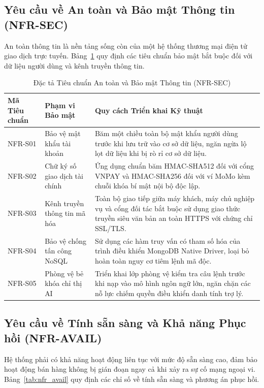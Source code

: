 \subsection{Yêu cầu về An toàn và Bảo mật Thông tin (NFR-SEC)}
An toàn thông tin là nền tảng sống còn của một hệ thống thương mại điện tử giao dịch trực tuyến. Bảng~\ref{tab:nfr_sec} quy định các tiêu chuẩn bảo mật bắt buộc đối với dữ liệu người dùng và kênh truyền thông tin.

\begin{table}[H]
\centering
\caption{Đặc tả Tiêu chuẩn An toàn và Bảo mật Thông tin (NFR-SEC)}
\label{tab:nfr_sec}
\begin{tabularx}{\textwidth}{p{2.5cm}p{4.5cm}X}
\toprule
\textbf{Mã Tiêu chuẩn} & \textbf{Phạm vi Bảo mật} & \textbf{Quy cách Triển khai Kỹ thuật} \\
\midrule
NFR-S01 & Bảo vệ mật khẩu tài khoản & Băm một chiều toàn bộ mật khẩu người dùng trước khi lưu trữ vào cơ sở dữ liệu, ngăn ngừa lộ lọt dữ liệu khi bị rò rỉ cơ sở dữ liệu. \\
\addlinespace
NFR-S02 & Chữ ký số giao dịch tài chính & Ứng dụng chuẩn băm HMAC-SHA512 đối với cổng VNPAY và HMAC-SHA256 đối với ví MoMo kèm chuỗi khóa bí mật nội bộ độc lập. \\
\addlinespace
NFR-S03 & Kênh truyền thông tin mã hóa & Toàn bộ giao tiếp giữa máy khách, máy chủ nghiệp vụ và cổng đối tác bắt buộc sử dụng giao thức truyền siêu văn bản an toàn HTTPS với chứng chỉ SSL/TLS. \\
\addlinespace
NFR-S04 & Bảo vệ chống tấn công NoSQL & Sử dụng các hàm truy vấn có tham số hóa của trình điều khiển MongoDB Native Driver, loại bỏ hoàn toàn nguy cơ tiêm lệnh mã độc. \\
\addlinespace
NFR-S05 & Phòng vệ bẻ khóa chỉ thị AI & Triển khai lớp phòng vệ kiểm tra câu lệnh trước khi nạp vào mô hình ngôn ngữ lớn, ngăn chặn các nỗ lực chiếm quyền điều khiển danh tính trợ lý. \\
\bottomrule
\end{tabularx}
\end{table}

\subsection{Yêu cầu về Tính sẵn sàng và Khả năng Phục hồi (NFR-AVAIL)}
Hệ thống phải có khả năng hoạt động liên tục với mức độ sẵn sàng cao, đảm bảo hoạt động bán hàng không bị gián đoạn ngay cả khi xảy ra sự cố mạng ngoại vi. Bảng~\ref{tab:nfr_avail} quy định các chỉ số về tính sẵn sàng và phương án phục hồi.

